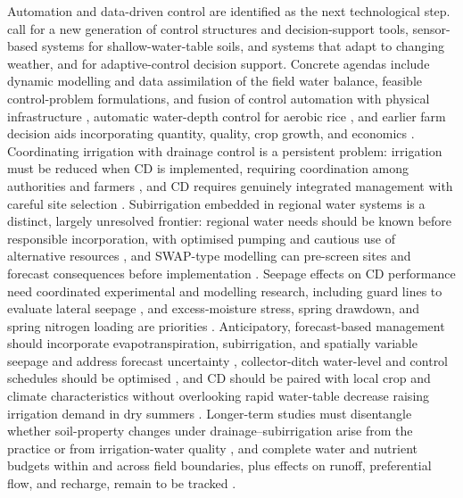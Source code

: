\documentclass[11pt]{article}
\begin{document}
Automation and data-driven control are identified as the next technological step.
\textcite{Youssef2023} call for a new generation of control structures and
decision-support tools, sensor-based systems for shallow-water-table soils, and
systems that adapt to changing weather, and \textcite{Ayars2015} for
adaptive-control decision support. Concrete agendas include dynamic modelling and
data assimilation of the field water balance, feasible control-problem
formulations, and fusion of control automation with physical infrastructure
\parencite{Ikonen2023,Isomäki2024}, automatic water-depth control for aerobic rice
\parencite{Arif2021}, and earlier farm decision aids incorporating quantity,
quality, crop growth, and economics \parencite{THOMAS1995}. Coordinating
irrigation with drainage control is a persistent problem: irrigation must be
reduced when CD is implemented, requiring coordination among authorities and
farmers \parencite{Wahba2005,Ritzema2011,Ritzema2016}, and CD requires genuinely
integrated management with careful site selection \parencite{Dukhovny2018}.
Subirrigation embedded in regional water systems is a distinct, largely
unresolved frontier: regional water needs should be known before responsible
incorporation, with optimised pumping and cautious use of alternative resources
\parencite{deWit2022}, and SWAP-type modelling can pre-screen sites and forecast
consequences before implementation \parencite{deWit2024}. Seepage effects on CD
performance need coordinated experimental and modelling research, including guard
lines to evaluate lateral seepage \parencite{Youssef2021,Pease2017,Ale2009}, and
excess-moisture stress, spring drawdown, and spring nitrogen loading are priorities
\parencite{Craft2018,Lahdou2019}. Anticipatory, forecast-based management should
incorporate evapotranspiration, subirrigation, and spatially variable seepage and
address forecast uncertainty \parencite{VandeCraats2021}, collector-ditch
water-level and control schedules should be optimised
\parencite{Salla2022,Strock2025b}, and CD should be paired with local crop and
climate characteristics without overlooking rapid water-table decrease raising
irrigation demand in dry summers
\parencite{Güngör2023,Dou2023,Golmohammadi2016,Kim2023,Wang2020c}. Longer-term
studies must disentangle whether soil-property changes under
drainage--subirrigation arise from the practice or from irrigation-water quality
\parencite{Kaur2023}, and complete water and nutrient budgets within and across
field boundaries, plus effects on runoff, preferential flow, and recharge, remain
to be tracked \parencite{Shedekar2021,Ross2016,King2022}.
\end{document}
